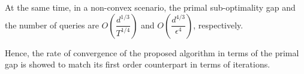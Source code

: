 \begin{multicols}{2}
At the same time, in a non-convex scenario, the primal sub-optimality gap and the
number of queries are $O(\dfrac{d^{1/3}}{T^{1/4}})$ and $O\left(\dfrac{d^{4/3}}{\epsilon^4}\right)$, 
respectively.

Hence, the rate of convergence of the proposed algorithm in terms of the 
primal gap is showed to match its first order counterpart in terms
of iterations.

 
\medskip
\printbibliography %

\end{multicols}%

 
  















